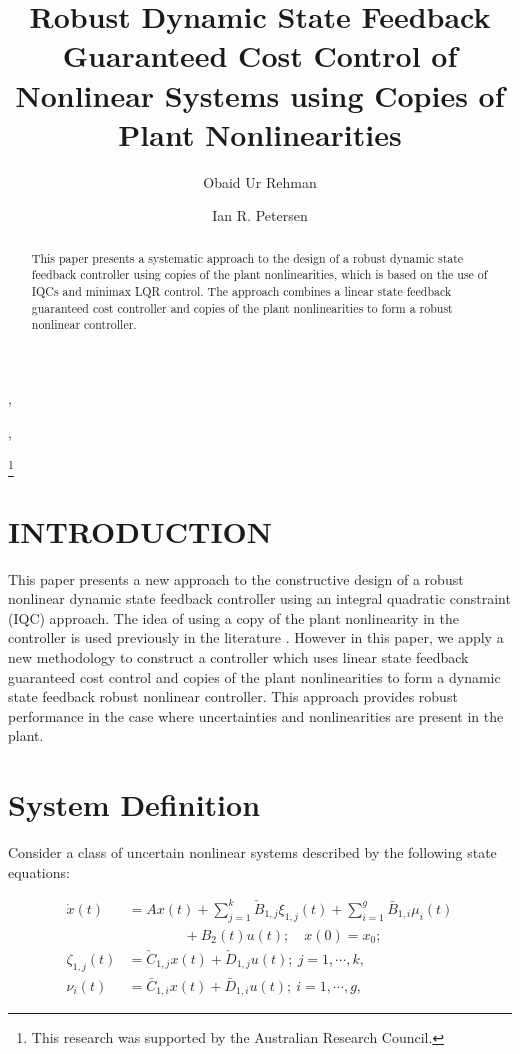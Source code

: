 \documentclass[twocolumn]{autart}
\begin{document}
\begin{frontmatter}
\title{Robust Dynamic State Feedback Guaranteed Cost Control of Nonlinear Systems using Copies of Plant Nonlinearities}

\author[SEIT]{Obaid Ur Rehman},    \author[SEIT]{Ian R. Petersen}, 
\address[SEIT]{School of Engineering and Information Technology, University of New South Wales, Canberra, Australia.} 
\thanks{This research was supported by the Australian Research Council.}
\begin{abstract}
This paper presents a systematic approach to the design of a robust dynamic state feedback controller using copies of the plant nonlinearities, which is based on the use of IQCs and minimax LQR control. The approach combines a linear state feedback guaranteed cost controller and copies of the plant nonlinearities to form a robust nonlinear controller.
\end{abstract}
\end{frontmatter}
\section{INTRODUCTION}
This paper presents a new approach to the constructive design of a robust nonlinear dynamic state feedback  controller using an integral quadratic constraint (IQC) approach. The idea of using a copy of the plant nonlinearity in the controller is used previously in the literature \cite{outputfeedback_petersen,GLover_Nonlinear,Chu_Nonlinear}. However in this paper, we apply a new methodology to  construct a controller which uses linear state feedback guaranteed cost control and copies of the plant nonlinearities to form a dynamic state feedback robust nonlinear controller. This approach provides robust performance in the case where uncertainties and nonlinearities are present in the plant. 
\section{System Definition}\label{sec:system}
Consider a class of uncertain nonlinear systems described by the following state equations:
\begin{small}
\begin{equation}
\label{eqsystem}
\begin{split}
\dot{x}(t)&=A x(t)+ \sum_{j=1}^k \check{B}_{1,j} \xi_{1,j}(t)+ \sum_{i=1}^g \bar{B}_{1,i}\mu_i (t)\\
&\qquad \qquad+B_2(t) u(t);\quad x(0)=x_0;\\
\zeta_{1,j}(t)&=\check{C}_{1,j} x(t)+\check{D}_{1,j}u(t);~j=1,\cdots,k,\\
\nu_i (t)&=\bar{C}_{1,i} x(t)+\bar{D}_{1,i}u(t);~i=1,\cdots,g,
\end{split}
\end{equation}
\end{small}
\end{document}
